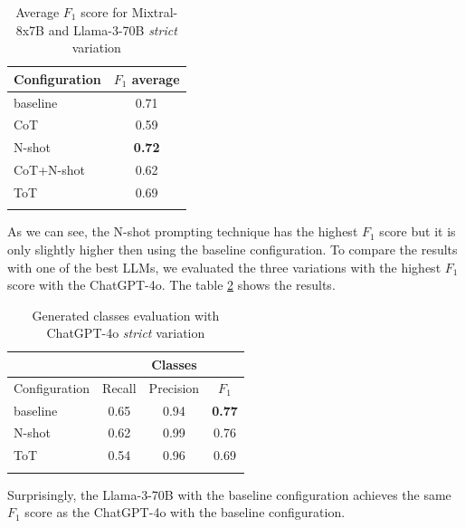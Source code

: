 \begin{table}[!h]
    \scriptsize
    \centering
    \setlength{\tabcolsep}{0.5em}
    \begin{tabular}{lc}
    \toprule
        Configuration & $F_1$ average \\
    \toprule
    
    \addlinespace
         baseline   & 0.71 \\
         CoT        & 0.59 \\
         N-shot     & \textbf{0.72} \\
         CoT+N-shot & 0.62 \\
         ToT        & 0.69 \\
    \addlinespace
    \bottomrule
    \addlinespace
    \end{tabular}
    \caption{Average $F_1$ score for Mixtral-8x7B and Llama-3-70B \emph{strict} variation}
    \label{tab:average-classes}
\end{table}

As we can see, the N-shot prompting technique has the highest $F_1$ score but it is only slightly higher then using the baseline configuration. To compare the results with one of the best LLMs, we evaluated the three variations with the highest $F_1$ score with the ChatGPT-4o. The table \ref{tab:chatgpt-classes} shows the results.


\begin{table}[!h]
    \scriptsize
    \centering
    \setlength{\tabcolsep}{0.5em}
    \begin{tabular}{lccc}
    \toprule
    & & Classes & \\
    \toprule
       Configuration & Recall & Precision & $F_1$ \\
    \toprule
    
    \addlinespace
         baseline    & 0.65 & 0.94 & \textbf{0.77} \\
         N-shot      & 0.62 & 0.99 & 0.76 \\
         ToT         & 0.54 & 0.96 & 0.69 \\
    \addlinespace
    \bottomrule
    \addlinespace
    \end{tabular}
    \caption{Generated classes evaluation with ChatGPT-4o \emph{strict} variation}
    \label{tab:chatgpt-classes}
\end{table}

Surprisingly, the Llama-3-70B with the baseline configuration achieves the same $F_1$ score as the ChatGPT-4o with the baseline configuration. %


